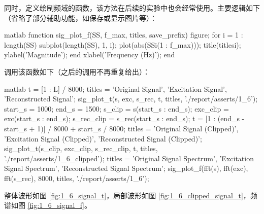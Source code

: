 \documentclass[a4paper]{article}  %
\begin{document}
同时，定义绘制频域的函数，该方法在后续的实验中也会经常使用。主要逻辑如下（省略了部分辅助功能，如保存或显示图片等）：
\begin{codeblock}{matlab}
function sig_plot_f(SS, f_max, titles, save_prefix)
    figure;
    for i = 1 : length(SS)
        subplot(length(SS), 1, i);
        plot(abs(SS{i}(1 : f_max)));
        title(titles{i});
        ylabel('Magnitude');
    end
    xlabel('Frequency (Hz)');
end
\end{codeblock}

调用该函数如下（之后的调用不再重复给出）：
\begin{codeblock}{matlab}
t = [1 : L] / 8000;
titles = {'Original Signal', 'Excitation Signal', 'Reconstructed Signal'};
sig_plot_t({s, exc, s_rec}, t, titles, './report/asserts/1_6');
start_s = 1000;
end_s = 1500;
s_clip = s(start_s : end_s);
exc_clip = exc(start_s : end_s);
s_rec_clip = s_rec(start_s : end_s);
t = [1 : (end_s - start_s + 1)] / 8000 + start_s / 8000;
titles = {'Original Signal (Clipped)', 'Excitation Signal (Clipped)', 'Reconstructed Signal (Clipped)'};
sig_plot_t({s_clip, exc_clip, s_rec_clip}, t, titles, './report/asserts/1_6_clipped');
titles = {'Original Signal Spectrum', 'Excitation Signal Spectrum', 'Reconstructed Signal Spectrum'};
sig_plot_f({fft(s), fft(exc), fft(s_rec)}, 8000, titles, './report/asserts/1_6');
\end{codeblock}    

整体波形如图 \ref{fig:1_6_signal_t}，局部波形如图 \ref{fig:1_6_clipped_signal_t}，频谱如图 \ref{fig:1_6_signal_f}。
\end{document}
